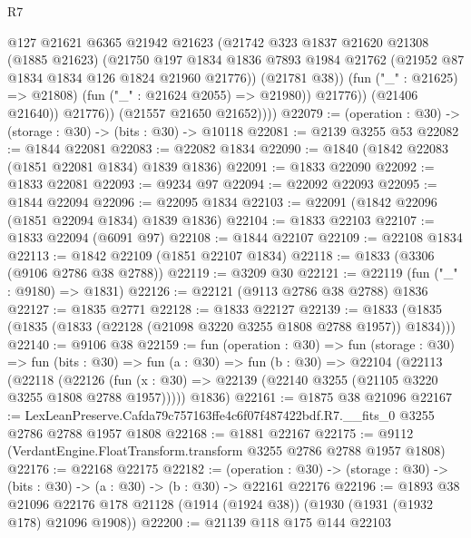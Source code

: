 \begin{lexlean}{R7}
\begin{coremodule}
                      @127
                      @21621
                      @6365
                      @21942
                      @21623
                      (@21742
                        @323
                        @1837
                        @21620
                        @21308
                        (@1885 @21623)
                        (@21750
                          @197
                          @1834
                          @1836
                          @7893
                          @1984
                          @21762
                          (@21952 @87 @1834 @1834 @126 @1824 @21960 @21776))
                        (@21781 @38))
                      (fun ("_" : @21625) => @21808)
                      (fun ("_" : @21624 @2055) => @21980))
                    @21776))
                (@21406 @21640))
              @21776))
          (@21557 @21650 @21652))))
@22079 := (operation : @30) -> (storage : @30) -> (bits : @30) -> @10118
@22081 := @2139 @3255 @53
@22082 := @1844 @22081
@22083 := @22082 @1834
@22090 := @1840 (@1842 @22083 (@1851 @22081 @1834) @1839 @1836)
@22091 := @1833 @22090
@22092 := @1833 @22081
@22093 := @9234 @97
@22094 := @22092 @22093
@22095 := @1844 @22094
@22096 := @22095 @1834
@22103 := @22091 (@1842 @22096 (@1851 @22094 @1834) @1839 @1836)
@22104 := @1833 @22103
@22107 := @1833 @22094 (@6091 @97)
@22108 := @1844 @22107
@22109 := @22108 @1834
@22113 := @1842 @22109 (@1851 @22107 @1834)
@22118 := @1833 (@3306 (@9106 @2786 @38 @2788))
@22119 := @3209 @30
@22121 := @22119 (fun ("_" : @9180) => @1831)
@22126 := @22121 (@9113 @2786 @38 @2788) @1836
@22127 := @1835 @2771
@22128 := @1833 @22127
@22139 := @1833 (@1835 (@1835 (@1833 (@22128 (@21098 @3220 @3255 @1808 @2788 @1957)) @1834)))
@22140 := @9106 @38
@22159 := fun (operation : @30) =>
  fun (storage : @30) =>
  fun (bits : @30) =>
  fun (a : @30) =>
  fun (b : @30) =>
  @22104
    (@22113
      (@22118
        (@22126 (fun (x : @30) => @22139 (@22140 @3255 (@21105 @3220 @3255 @1808 @2788 @1957)))))
      @1836)
@22161 := @1875 @38 @21096
@22167 := LexLeanPreserve.Cafda79c757163ffe4c6f07f487422bdf.R7.__fits_0
    @3255
    @2786
    @2788
    @1957
    @1808
@22168 := @1881 @22167
@22175 := @9112 (VerdantEngine.FloatTransform.transform @3255 @2786 @2788 @1957 @1808)
@22176 := @22168 @22175
@22182 := (operation : @30) ->
  (storage : @30) -> (bits : @30) -> (a : @30) -> (b : @30) -> @22161 @22176
@22196 := @1893
    @38
    @21096
    @22176
    @178
    @21128
    (@1914 (@1924 @38))
    (@1930 (@1931 (@1932 @178) @21096 @1908))
@22200 := @21139 @118 @175 @144 @22103

\end{coremodule}
\end{lexlean}
